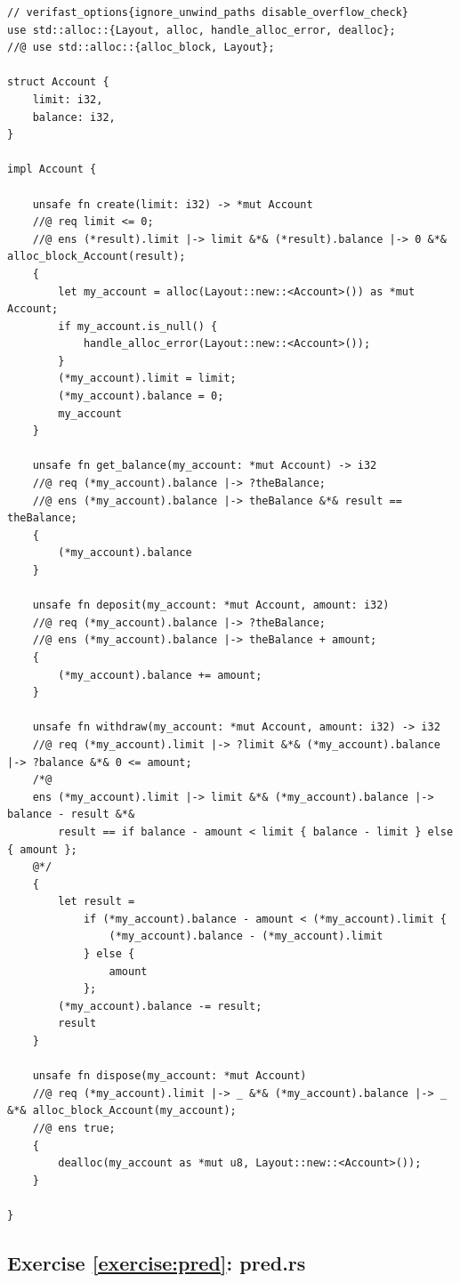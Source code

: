 \documentclass{article}
\begin{document}
\begin{lstlisting}
// verifast_options{ignore_unwind_paths disable_overflow_check}
use std::alloc::{Layout, alloc, handle_alloc_error, dealloc};
//@ use std::alloc::{alloc_block, Layout};

struct Account {
    limit: i32,
    balance: i32,
}

impl Account {

    unsafe fn create(limit: i32) -> *mut Account
    //@ req limit <= 0;
    //@ ens (*result).limit |-> limit &*& (*result).balance |-> 0 &*& alloc_block_Account(result);
    {
        let my_account = alloc(Layout::new::<Account>()) as *mut Account;
        if my_account.is_null() {
            handle_alloc_error(Layout::new::<Account>());
        }
        (*my_account).limit = limit;
        (*my_account).balance = 0;
        my_account
    }

    unsafe fn get_balance(my_account: *mut Account) -> i32
    //@ req (*my_account).balance |-> ?theBalance;
    //@ ens (*my_account).balance |-> theBalance &*& result == theBalance;
    {
        (*my_account).balance
    }

    unsafe fn deposit(my_account: *mut Account, amount: i32)
    //@ req (*my_account).balance |-> ?theBalance;
    //@ ens (*my_account).balance |-> theBalance + amount;
    {
        (*my_account).balance += amount;
    }

    unsafe fn withdraw(my_account: *mut Account, amount: i32) -> i32
    //@ req (*my_account).limit |-> ?limit &*& (*my_account).balance |-> ?balance &*& 0 <= amount;
    /*@
    ens (*my_account).limit |-> limit &*& (*my_account).balance |-> balance - result &*&
        result == if balance - amount < limit { balance - limit } else { amount };
    @*/
    {
        let result =
            if (*my_account).balance - amount < (*my_account).limit {
                (*my_account).balance - (*my_account).limit
            } else {
                amount
            };
        (*my_account).balance -= result;
        result
    }

    unsafe fn dispose(my_account: *mut Account)
    //@ req (*my_account).limit |-> _ &*& (*my_account).balance |-> _ &*& alloc_block_Account(my_account);
    //@ ens true;
    {
        dealloc(my_account as *mut u8, Layout::new::<Account>());
    }

}
\end{lstlisting}

\subsection{Exercise \ref{exercise:pred}: pred.rs}
\end{document}
